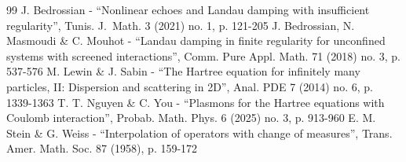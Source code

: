 \begin{thebibliography}{99}
 J. Bedrossian - “Nonlinear echoes and Landau damping with insufficient regularity”, Tunis. J. Math. 3 (2021) no. 1, p. 121-205
 J. Bedrossian, N. Masmoudi \& C. Mouhot - “Landau damping in finite regularity for unconfined systems with screened interactions”, Comm. Pure Appl. Math. 71 (2018) no. 3, p. 537-576
 M. Lewin \& J. Sabin - “The Hartree equation for infinitely many particles, II: Dispersion and scattering in 2D”, Anal. PDE 7 (2014) no. 6, p. 1339-1363
 T. T. Nguyen \& C. You - “Plasmons for the Hartree equations with Coulomb interaction”, Probab. Math. Phys. 6 (2025) no. 3, p. 913-960
 E. M. Stein \& G. Weiss - “Interpolation of operators with change of measures”, Trans. Amer. Math. Soc. 87 (1958), p. 159-172
\end{thebibliography}
